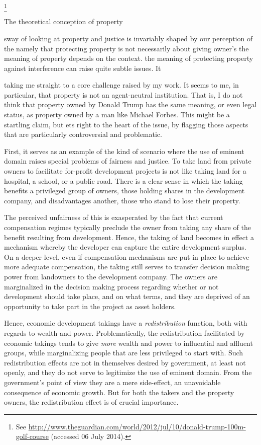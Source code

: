 \footnote{See \url{http://www.theguardian.com/world/2012/jul/10/donald-trump-100m-golf-course} (accessed 06 July 2014).}

The theoretical conception of property 


sway of looking at property and justice is invariably shaped by our perception of the 
namely that protecting property is not necessarily about giving owner's 
the meaning of property depends on the context. 
the meaning of protecting property against interference can raise quite subtle issues. It 

taking me straight to a core challenge raised by my work. It seems to me, in particular, that property is not an agent-neutral institution. That is, I do not think that property owned by Donald Trump has the same meaning, or even legal status, as property owned by a man like Michael Forbes. This might be a startling claim, but 
ets right to the heart of the issue, by flagging those aspects that are particularly controversial and problematic. 



First, it  serves as an example of the kind of scenario where the use of eminent domain raises special problems of fairness and justice. To take land from private owners to facilitate for-profit development projects is not like taking land for a hospital, a school, or a public road. There is a clear sense in which the taking benefits a privileged group of owners, those holding shares in the development company, and disadvantages another, those who stand to lose their property. 

The perceived unfairness of this is exasperated by the fact that current compensation regimes typically preclude the owner from taking any share of the benefit resulting from development. Hence, the taking of land becomes in effect a mechanism whereby the developer can capture the entire development surplus. On a deeper level, even if compensation mechanisms are put in place to achieve more adequate compensation, the taking still serves to transfer decision making power from landowners to the development company. The owners are marginalized in the decision making process regarding whether or not development should take place, and on what terms, and they are deprived of an opportunity to take part in the project as asset holders.

Hence, economic development takings have a {\it redistribution} function, both with regards to wealth and power. Problematically, the redistribution facilitated by economic takings tends to give {\it more} wealth and power to influential and affluent groups, while marginalizing people that are less privileged to start with. Such redistribution effects are not in themselves desired by government, at least not openly, and they do not serve to legitimize the use of eminent domain. From the government's point of view they are a mere side-effect, an unavoidable consequence of economic growth. But for both the takers and the property owners, the redistribution effect is of crucial importance. 

